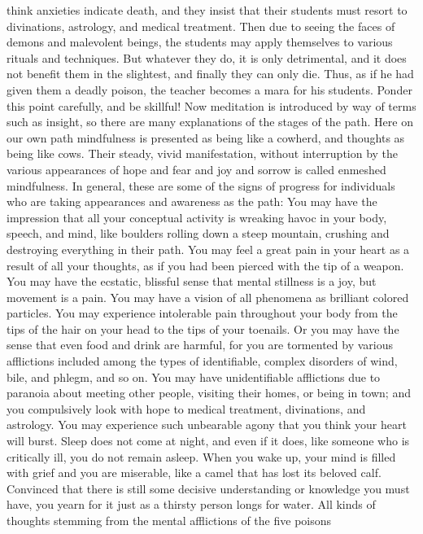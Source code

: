 \documentclass[a4paper,11pt,twoside,final]{book}
\begin{document}
think anxieties indicate death, and they insist that their students
must resort to divinations, astrology, and medical treatment. Then due
to seeing the faces of demons and malevolent beings, the students may
apply themselves to various rituals and techniques. But whatever they
do, it is only detrimental, and it does not benefit them in the
slightest, and finally they can only die. Thus, as if he had given
them a deadly poison, the teacher becomes a mara for his
students. Ponder this point carefully, and be skillful!  Now
meditation is introduced by way of terms such as insight, so there are
many explanations of the stages of the path. Here on our own path
mindfulness is presented as being like a cowherd, and thoughts as
being like cows. Their steady, vivid manifestation, without
interruption by the various appearances of hope and fear and joy and
sorrow is called enmeshed mindfulness. In general, these are some of
the signs of progress for individuals who are taking appearances and
awareness as the path: You may have the impression that all your
conceptual activity is wreaking havoc in your body, speech, and mind,
like boulders rolling down a steep mountain, crushing and destroying
everything in their path. You may feel a great pain in your heart as a
result of all your thoughts, as if you had been pierced with the tip
of a weapon. You may have the ecstatic, blissful sense that mental
stillness is a joy, but movement is a pain. You may have a vision of
all phenomena as brilliant colored particles.  You may experience
intolerable pain throughout your body from the tips of the hair on
your head to the tips of your toenails.  Or you may have the sense
that even food and drink are harmful, for you are tormented by various
afflictions included among the  types of
identifiable, complex disorders of wind, bile, and phlegm, and so
on. You may have unidentifiable afflictions due to paranoia about
meeting other people, visiting their homes, or being in town; and you
compulsively look with hope to medical treatment, divinations, and
astrology. You may experience such unbearable agony that you think
your heart will burst. Sleep does not come at night, and even if it
does, like someone who is critically ill, you do not remain asleep.
When you wake up, your mind is filled with grief and you are
miserable, like a camel that has lost its beloved calf. Convinced that
there is still some decisive understanding or knowledge you must have,
you yearn for it just as a thirsty person longs for water. All kinds
of thoughts stemming from the mental afflictions of the five poisons
\end{document}
